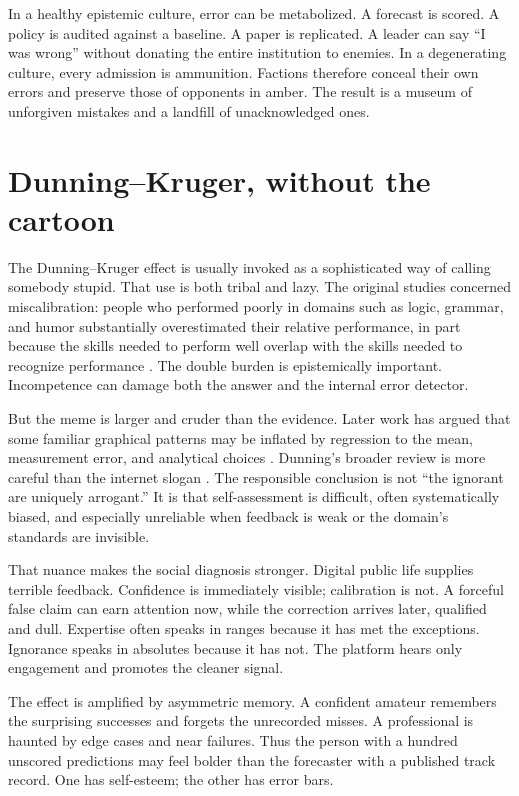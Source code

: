 ﻿\documentclass[12pt,a4paper]{book}
\begin{document}
In a healthy epistemic culture, error can be metabolized. A forecast is scored. A policy is audited against a baseline. A paper is replicated. A leader can say “I was wrong” without donating the entire institution to enemies. In a degenerating culture, every admission is ammunition. Factions therefore conceal their own errors and preserve those of opponents in amber. The result is a museum of unforgiven mistakes and a landfill of unacknowledged ones.

\section{Dunning--Kruger, without the cartoon}

The Dunning--Kruger effect is usually invoked as a sophisticated way of calling somebody stupid. That use is both tribal and lazy. The original studies concerned miscalibration: people who performed poorly in domains such as logic, grammar, and humor substantially overestimated their relative performance, in part because the skills needed to perform well overlap with the skills needed to recognize performance \cite{Kruger1999-mv}. The double burden is epistemically important. Incompetence can damage both the answer and the internal error detector.

But the meme is larger and cruder than the evidence. Later work has argued that some familiar graphical patterns may be inflated by regression to the mean, measurement error, and analytical choices \cite{GignacZajenkowski2020}. Dunning's broader review is more careful than the internet slogan \cite{Dunning2011-hf}. The responsible conclusion is not “the ignorant are uniquely arrogant.” It is that self-assessment is difficult, often systematically biased, and especially unreliable when feedback is weak or the domain's standards are invisible.

That nuance makes the social diagnosis stronger. Digital public life supplies terrible feedback. Confidence is immediately visible; calibration is not. A forceful false claim can earn attention now, while the correction arrives later, qualified and dull. Expertise often speaks in ranges because it has met the exceptions. Ignorance speaks in absolutes because it has not. The platform hears only engagement and promotes the cleaner signal.

The effect is amplified by asymmetric memory. A confident amateur remembers the surprising successes and forgets the unrecorded misses. A professional is haunted by edge cases and near failures. Thus the person with a hundred unscored predictions may feel bolder than the forecaster with a published track record. One has self-esteem; the other has error bars.
\end{document}
